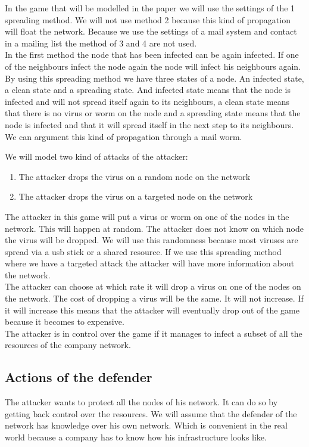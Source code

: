 In the game that will be modelled in the paper we will use the settings of the 1 spreading method. We will not use method 2 because this kind of propagation will float the network. Because we use the settings of a mail system and contact in a mailing list the method of 3 and 4 are not used. \\
In the first method the node that has been infected can be again infected. If one of the neighbours infect the node again the node will infect his neighbours again. By using this spreading method we have three states of a node. An infected state, a clean state and a spreading state. And infected state means that the node is infected and will not spread itself again to its neighbours, a clean state means that there is no virus or worm on the node and a spreading state means that the node is infected and that it will spread itself in the next step to its neighbours.
We can argument this kind of propagation through a mail worm. 

We will model two kind of attacks of the attacker:
\begin{enumerate}
\item The attacker drops the virus on a random node on the network
\item The attacker drops the virus on a targeted node on the network
\end{enumerate}
The attacker in this game will put a virus or worm on one of the nodes in the network. This will happen at random. The attacker does not know on which node the virus will be dropped. We will use this randomness because  most viruses are spread via a usb stick or a shared resource. If we use this spreading method where we have a targeted attack the attacker will have more information about the network. \\

The attacker can choose at which rate it will drop a virus on one of the nodes on the network. The cost of dropping a virus will be the same. It will not increase. If it will increase this means that the attacker will eventually drop out of the game because it becomes to expensive.\\
The attacker is in control over the game if it manages to infect a subset of all the resources of the company network.


\subsection{Actions of the defender}
The attacker wants to protect all the nodes of his network. It can do so by getting back control over the resources. We will assume that the defender of the network has knowledge over his own network. Which is convenient in the real world because a company has to know how his infrastructure looks like.\\

